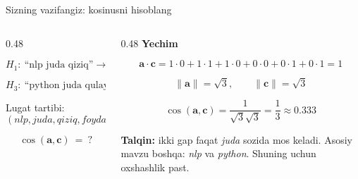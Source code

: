\documentclass[aspectratio=169,11pt]{beamer}
\begin{document}
\begin{frame}{Sizning vazifangiz: kosinusni hisoblang}
\footnotesize

\begin{columns}[T,totalwidth=\textwidth]
\begin{column}{0.48\textwidth}
\begin{tcolorbox}[alertbox,title=Vazifa]
\[
H_1:\ \text{``nlp juda qiziq''}
\rightarrow
\mathbf{a}=(1,1,1,0,0,0)
\]

\[
H_3:\ \text{``python juda qulay''}
\rightarrow
\mathbf{c}=(0,1,0,0,1,1)
\]

\vspace{-2pt}
Lug\textquotesingle{}at tartibi:
\[
(\textit{nlp},\textit{juda},\textit{qiziq},
\textit{foydali},\textit{python},\textit{qulay})
\]

\vspace{-2pt}
\[
\cos(\mathbf{a},\mathbf{c})\ =\ ?
\]
\end{tcolorbox}
\end{column}

\begin{column}{0.48\textwidth}
\textbf{Yechim}

\[
\mathbf{a}\cdot\mathbf{c}
=
1\cdot0+1\cdot1+1\cdot0
+0\cdot0+0\cdot1+0\cdot1
=
1
\]

\[
\|\mathbf{a}\|=\sqrt{3},
\qquad
\|\mathbf{c}\|=\sqrt{3}
\]

\[
\cos(\mathbf{a},\mathbf{c})
=
\frac{1}{\sqrt{3}\sqrt{3}}
=
\frac{1}{3}
\approx 0.333
\]

\vspace{2pt}

\begin{tcolorbox}[defbox]
\footnotesize
\textbf{Talqin:} ikki gap faqat \textit{juda} so\textquotesingle{}zida
mos keladi. Asosiy mavzu boshqa: \textit{nlp} va \textit{python}.
Shuning uchun o\textquotesingle{}xshashlik past.
\end{tcolorbox}
\end{column}
\end{columns}

\end{frame}
\end{document}
